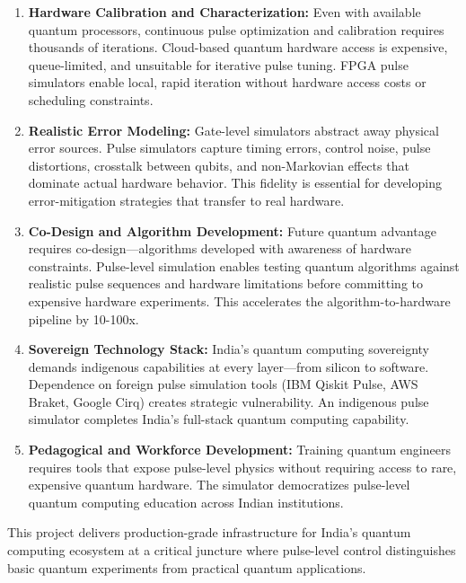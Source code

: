 \documentclass[12pt,a4paper]{article}
\begin{document}
\begin{enumerate}[noitemsep]
\item \textbf{Hardware Calibration and Characterization:} Even with available quantum processors, continuous pulse optimization and calibration requires thousands of iterations. Cloud-based quantum hardware access is expensive, queue-limited, and unsuitable for iterative pulse tuning. FPGA pulse simulators enable local, rapid iteration without hardware access costs or scheduling constraints.

\item \textbf{Realistic Error Modeling:} Gate-level simulators abstract away physical error sources. Pulse simulators capture timing errors, control noise, pulse distortions, crosstalk between qubits, and non-Markovian effects that dominate actual hardware behavior. This fidelity is essential for developing error-mitigation strategies that transfer to real hardware.

\item \textbf{Co-Design and Algorithm Development:} Future quantum advantage requires co-design—algorithms developed with awareness of hardware constraints. Pulse-level simulation enables testing quantum algorithms against realistic pulse sequences and hardware limitations before committing to expensive hardware experiments. This accelerates the algorithm-to-hardware pipeline by 10-100x.

\item \textbf{Sovereign Technology Stack:} India's quantum computing sovereignty demands indigenous capabilities at every layer—from silicon to software. Dependence on foreign pulse simulation tools (IBM Qiskit Pulse, AWS Braket, Google Cirq) creates strategic vulnerability. An indigenous pulse simulator completes India's full-stack quantum computing capability.

\item \textbf{Pedagogical and Workforce Development:} Training quantum engineers requires tools that expose pulse-level physics without requiring access to rare, expensive quantum hardware. The simulator democratizes pulse-level quantum computing education across Indian institutions.
\end{enumerate}

This project delivers production-grade infrastructure for India's quantum computing ecosystem at a critical juncture where pulse-level control distinguishes basic quantum experiments from practical quantum applications.

\newpage
\end{document}
